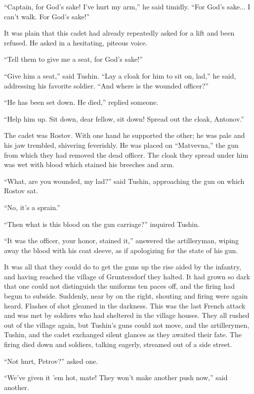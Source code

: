 ``Captain, for God's sake! I've hurt my arm,'' he said
timidly. ``For God's sake... I can't walk. For God's sake!''

It was plain that this cadet had already repeatedly asked for a
lift and been refused. He asked in a hesitating, piteous voice.

``Tell them to give me a seat, for God's sake!''

``Give him a seat,'' said Tushin. ``Lay a cloak for him to sit
on, lad,'' he said, addressing his favorite soldier. ``And where
is the wounded officer?''

``He has been set down. He died,'' replied someone.

``Help him up. Sit down, dear fellow, sit down! Spread out the
cloak, Antonov.''

The cadet was Rostov. With one hand he supported the other; he
was pale and his jaw trembled, shivering feverishly. He was
placed on ``Matvevna,'' the gun from which they had removed the
dead officer. The cloak they spread under him was wet with blood
which stained his breeches and arm.

``What, are you wounded, my lad?'' said Tushin, approaching the
gun on which Rostov sat.

``No, it's a sprain.''

``Then what is this blood on the gun carriage?'' inquired Tushin.

``It was the officer, your honor, stained it,'' answered the
artilleryman, wiping away the blood with his coat sleeve, as if
apologizing for the state of his gun.

It was all that they could do to get the guns up the rise aided
by the infantry, and having reached the village of Gruntersdorf
they halted. It had grown so dark that one could not distinguish
the uniforms ten paces off, and the firing had begun to
subside. Suddenly, near by on the right, shouting and firing were
again heard. Flashes of shot gleamed in the darkness. This was
the last French attack and was met by soldiers who had sheltered
in the village houses. They all rushed out of the village again,
but Tushin's guns could not move, and the artillerymen, Tushin,
and the cadet exchanged silent glances as they awaited their
fate. The firing died down and soldiers, talking eagerly,
streamed out of a side street.

``Not hurt, Petrov?'' asked one.

``We've given it 'em hot, mate! They won't make another push
now,'' said another.

